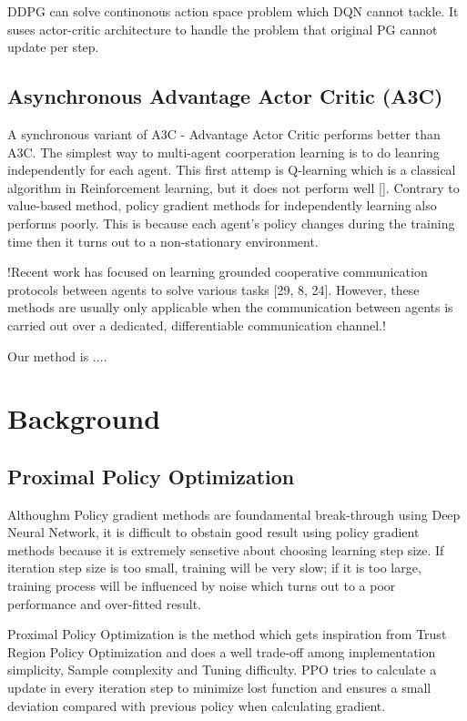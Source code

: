 \documentclass[11pt,twocolumn]{jarticle} %
\begin{document}
DDPG can solve continonous action space problem which DQN cannot tackle. It suses actor-critic architecture to handle the problem that original PG cannot update per step.
\subsection{Asynchronous Advantage Actor Critic (A3C)}
A synchronous variant of A3C - Advantage Actor Critic performs better than A3C.
The simplest way to multi-agent coorperation learning is to do leanring independently for each agent. This first attemp is Q-learning which is a classical algorithm in Reinforcement learning, but it does not perform well []. Contrary to value-based method, policy gradient methods for independently learning also performs poorly. This is because each agent's policy changes during the training time then it turns out to a non-stationary environment. \par

!Recent work has focused on learning grounded cooperative communication protocols between agents to solve various tasks [29, 8, 24]. However, these methods are usually only applicable when the communication between agents is carried out over a dedicated, differentiable communication channel.! \par

Our method is ....

\section{Background}

\subsection{Proximal Policy Optimization}
Althoughm Policy gradient methods are foundamental break-through using Deep Neural Network, it is difficult to obstain good result using policy gradient methods because it is extremely sensetive about choosing learning step size. If iteration step size is too small, training will be very slow; if it is too large, training process will be influenced by noise which turns out to a poor performance and over-fitted result. \par
Proximal Policy Optimization is the method which gets inspiration from Trust Region Policy Optimization and does a well trade-off among implementation simplicity, Sample complexity and Tuning difficulty. PPO tries to calculate a update in every iteration step to minimize lost function and ensures a small deviation compared with previous policy when calculating gradient.
\end{document}
